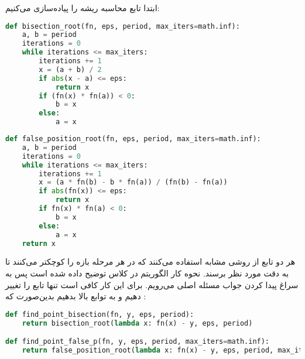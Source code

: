 \documentclass[]{article}
\begin{document}
ابتدا تابع محاسبه ریشه را پیاده‌سازی می‌کنیم:
\begin{latin}
\begin{lstlisting}[language=Python]
def bisection_root(fn, eps, period, max_iters=math.inf):
    a, b = period
    iterations = 0
    while iterations <= max_iters:
        iterations += 1
        x = (a + b) / 2
        if abs(x - a) <= eps:
            return x
        if (fn(x) * fn(a)) < 0:
            b = x
        else:
            a = x
\end{lstlisting}
\end{latin}

\begin{latin}
\begin{lstlisting}[language=Python] 
def false_position_root(fn, eps, period, max_iters=math.inf):
    a, b = period
    iterations = 0
    while iterations <= max_iters:
        iterations += 1
        x = (a * fn(b) - b * fn(a)) / (fn(b) - fn(a))
        if abs(fn(x)) <= eps:
            return x
        if fn(x) * fn(a) < 0:
            b = x
        else:
            a = x
    return x
\end{lstlisting}
\end{latin}
هر دو تابع از روشی مشابه استفاده می‌کنند که در هر مرحله بازه را کوچکتر می‌کنند
تا به دقت مورد نظر برسند.
نحوه کار الگوریتم در کلاس توضیح داده شده است پس  به سراغ پیدا کردن جواب مسئله اصلی می‌رویم.
برای این کار کافی است تنها تابع را تغییر دهیم و به توابع بالا بدهیم بدین‌صورت که :
\begin{latin}
\begin{lstlisting}[language=Python]
def find_point_bisection(fn, y, eps, period):
    return bisection_root(lambda x: fn(x) - y, eps, period)

def find_point_false_p(fn, y, eps, period, max_iters=math.inf):
    return false_position_root(lambda x: fn(x) - y, eps, period, max_iters)
\end{lstlisting}
\end{latin}
\end{document}
